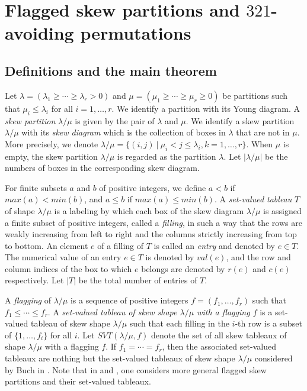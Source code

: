 \documentclass[11pt,reqno,sumlimits]{amsart}
\newcommand{\FSVT}{{SVT}}
\theoremstyle{definition}
\numberwithin{equation}{section}
\begin{document}
\section{Flagged skew partitions and $321$-avoiding permutations}
\subsection{Definitions and the main theorem}\label{S2}
Let $\lambda=(\lambda_1\geq \cdots \geq \lambda_r>0)$ and $\mu=(\mu_1\geq \cdots \geq \mu_r\geq 0)$ be partitions such that $\mu_i\leq \lambda_i$ for all $i=1,\dots,r$. We identify a partition with its Young diagram. A {\it skew partition} $\lambda/\mu$ is given by the pair of $\lambda$ and $\mu$. We identify a skew partition $\lambda/\mu$ with its {\it skew diagram} which is the collection of boxes in $\lambda$ that are not in $\mu$. More precisely, we denote $\lambda/\mu=\{(i,j) \ |\ \mu_i < j \leq \lambda_i, k=1,\dots, r \}$. When $\mu$ is empty, the skew partition $\lambda/\mu$ is regarded as the partition $\lambda$. Let $|\lambda/\mu|$ be the numbers of boxes in the corresponding skew diagram. 

For finite subsets $a$ and $b$ of positive integers, we define $a<b$ if $max(a)<min(b)$, and $a\leq b$ if $max(a)\leq min(b)$. A {\it set-valued tableau} $T$ of shape $\lambda/\mu$ is a labeling by which each box of the skew diagram $\lambda/\mu$ is assigned a finite subset of positive integers, called a {\it filling}, in such a way that the rows are weakly increasing from left to right and the columns strictly increasing from top to bottom. An element $e$ of a filling of $T$ is called an {\it entry} and denoted by $e \in T$. The numerical value of an entry $e \in T$ is denoted by $val(e)$, and the row and column indices of the box to which $e$ belongs are denoted by $r(e)$ and $c(e)$ respectively. Let $|T|$ be the total number of entries of $T$.

A {\it flagging} of $\lambda/\mu$ is a sequence of positive integers $f=(f_1,\dots, f_r)$ such that $f_1\leq \cdots \leq f_r$. A \emph{set-valued tableau of skew shape $\lambda/\mu$ with a flagging $f$} is a set-valued tableau of skew shape $\lambda/\mu$ such that each filling in the $i$-th row is a subset of $\{1,\dots,f_i\}$ for all $i$. Let $\FSVT(\lambda/\mu,f)$ denote the set of all skew tableaux of shape $\lambda/\mu$ with a flagging $f$. If $f_1=\cdots=f_r$, then the associated set-valued tableaux are nothing but the set-valued tableaux of skew shape $\lambda/\mu$ considered by Buch in \cite{BuchLRrule}. Note that in \cite{Wachs} and \cite{MatsumuraFlagged}, one considers more general flagged skew partitions and their set-valued tableaux. 
\end{document}
